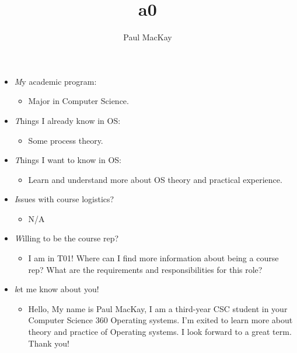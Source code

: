 \documentclass{article} %
\title{a0}
\author{Paul MacKay}
\begin{document}
\maketitle

\begin{itemize}
    \item \emph My academic program:
        \begin{itemize}
            \item Major in Computer Science.
        \end{itemize}

    \item \emph Things I already know in OS:
        \begin{itemize}
            \item Some process theory.
        \end{itemize}

    \item \emph Things I want to know in OS:
        \begin{itemize}
            \item Learn and understand more about OS theory and practical experience.
        \end{itemize}
    \item \emph Issues with course logistics?
        \begin{itemize}
            \item N/A
        \end{itemize}
    \item \emph Willing to be the course rep?
        \begin{itemize}
            \item I am in T01! Where can I find more information about being a course rep? What are the requirements and responsibilities for this role? 
        \end{itemize}
    \item \emph let me know about you!
        \begin{itemize}
            \item Hello, My name is Paul MacKay, I am a third-year CSC student 
                in your Computer Science 360 Operating systems. I'm exited to learn 
                more about theory and practice of Operating systems. I look forward 
                to a great term. Thank you!

        \end{itemize}
\end{itemize}
\end{document}
